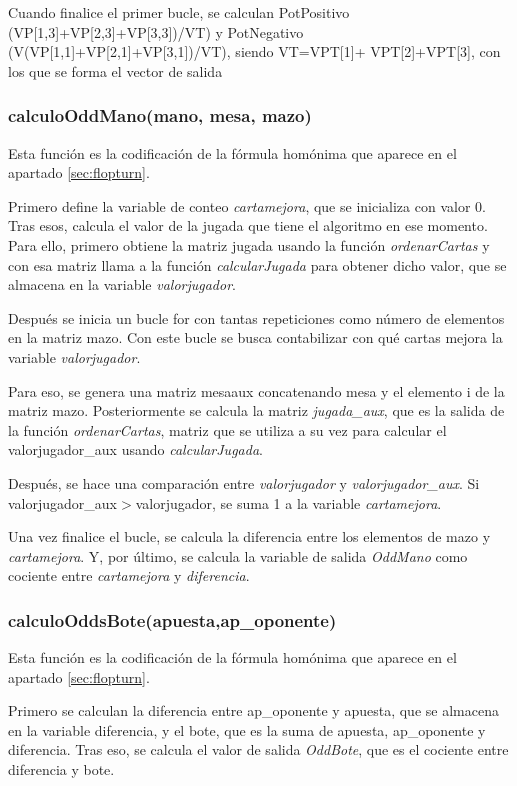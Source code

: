 Cuando finalice el primer bucle, se calculan PotPositivo (VP[1,3]+VP[2,3]+VP[3,3])/VT) y PotNegativo (V(VP[1,1]+VP[2,1]+VP[3,1])/VT), siendo VT=VPT[1]+ VPT[2]+VPT[3], con los que se forma el vector de salida

\subsubsection{calculoOddMano(mano, mesa, mazo)}

Esta función es la codificación de la fórmula homónima que aparece en el apartado  \ref{sec:flopturn}.

Primero define la variable de conteo \textit{cartamejora}, que se inicializa con valor 0.  Tras esos, calcula el valor de la jugada que tiene el algoritmo en ese momento. Para ello, primero obtiene la matriz jugada usando la función \textit{ordenarCartas} y con esa matriz llama a la función \textit{calcularJugada} para obtener dicho valor, que se almacena en la variable \textit{valorjugador}.

Después se inicia un bucle for con tantas repeticiones como número de elementos en la matriz mazo. Con este bucle se busca contabilizar con qué cartas mejora la variable \textit{valorjugador}.

Para eso, se genera una matriz mesaaux concatenando mesa y el elemento i de la matriz mazo. Posteriormente se calcula la matriz \textit{jugada\_aux}, que es la salida de la función \textit{ordenarCartas}, matriz que se utiliza a su vez para calcular el valorjugador\_aux usando \textit{calcularJugada}.

Después, se hace una comparación entre \textit{valorjugador} y \textit{valorjugador\_aux}. Si valorjugador\_aux$>$valorjugador, se suma 1 a la variable \textit{cartamejora}.

Una vez finalice el bucle, se calcula la diferencia entre los elementos de mazo y \textit{cartamejora}. Y, por último, se calcula la variable de salida \textit{OddMano} como cociente entre \textit{cartamejora} y \textit{diferencia}.

\subsubsection{calculoOddsBote(apuesta,ap\_oponente)}

Esta función es la codificación de la fórmula homónima que aparece en el apartado  \ref{sec:flopturn}.

Primero se calculan la diferencia entre ap\_oponente y apuesta, que se almacena en la variable diferencia, y el bote, que es la suma de apuesta, ap\_oponente y diferencia.
Tras eso, se calcula el valor de salida \textit{OddBote}, que es el cociente entre diferencia y bote.

